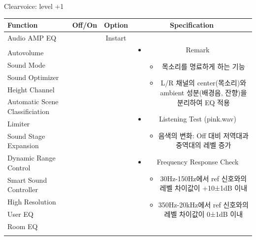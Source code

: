 \documentclass{beamer}
\begin{document}
	\begin{frame}[t]{Clearvoice: level +1}
		\begin{tiny}
			\begin{tabular}{@{}lccc@{}}
				\toprule
				Function & Off/On & Option & Specification \\
				\midrule
				Audio AMP EQ & \color{black}{Off} & Instart &
				\multirow{14}{60mm}{
					\begin{itemize}
						\item Remark
						\begin{itemize}
							\item 목소리를 명료하게 하는 기능
							\item L/R 채널의 center(목소리)와 ambient 성분(배경음, 잔향)을 분리하여 EQ 적용
						\end{itemize}
						\item Listening Test (pink.wav)
						\begin{itemize}
							\item 음색의 변화: Off 대비 저역대과 중역대의 레벨 증가
						\end{itemize}
						\item Frequency Response Check
						\begin{itemize}
							\item 30Hz-150Hz에서 ref 신호와의 레벨 차이값이 +10±1dB 이내
							\item 350Hz-20kHz에서 ref 신호와의 레벨 차이값이 0±1dB 이내
						\end{itemize}
					\end{itemize}
				} \\
				\color{blue}{Clearvoice} & \color{blue}{On} & \color{blue}{+1} & \\
				Autovolume & \color{black}{Off} & & \\
				Sound Mode & \color{black}{Off} & & \\
				Sound Optimizer & \color{black}{Off} & & \\
				Height Channel & \color{black}{Off} & & \\
				Automatic Scene Classificiation & \color{black}{Off} & & \\
				Limiter & \color{black}{Off} & & \\
				Sound Stage Expansion & \color{black}{Off} & & \\
				Dynamic Range Control & \color{black}{Off} & & \\
				Smart Sound Controller & \color{black}{Off} & & \\
				High Resolution & \color{black}{Off} & & \\
				User EQ & \color{black}{Off} & & \\
				Room EQ & \color{black}{Off} & & \\
				\color{blue}{OSD Volume} & \color{blue}{On} &  \color{blue}{Vol.40} & \\
				\midrule
			\end{tabular}
		\end{tiny}
		

\end{frame}
\end{document}
